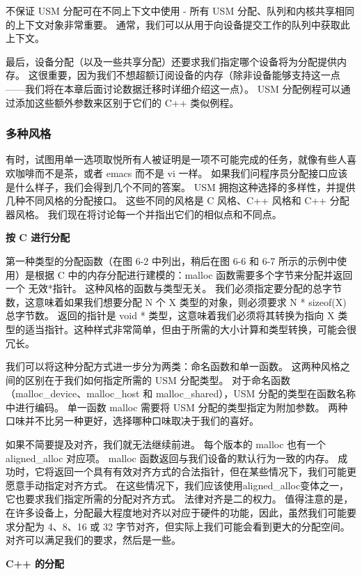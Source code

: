 不保证 USM 分配可在不同上下文中使用 - 所有 USM 分配、队列和内核共享相同的上下文对象非常重要。 通常，我们可以从用于向设备提交工作的队列中获取此上下文。

最后，设备分配（以及一些共享分配）还要求我们指定哪个设备将为分配提供内存。 这很重要，因为我们不想超额订阅设备的内存（除非设备能够支持这一点——我们将在本章后面讨论数据迁移时详细介绍这一点）。 USM 分配例程可以通过添加这些额外参数来区别于它们的 C++ 类似例程。

\subsubsection{多种风格}
有时，试图用单一选项取悦所有人被证明是一项不可能完成的任务，就像有些人喜欢咖啡而不是茶，或者 emacs 而不是 vi 一样。 如果我们问程序员分配接口应该是什么样子，我们会得到几个不同的答案。 USM 拥抱这种选择的多样性，并提供几种不同风格的分配接口。 这些不同的风格是 C 风格、C++ 风格和 C++ 分配器风格。 我们现在将讨论每一个并指出它们的相似点和不同点。

\textbf{按 C 进行分配}

第一种类型的分配函数（在图 6-2 中列出，稍后在图 6-6 和 6-7 所示的示例中使用）是根据 C 中的内存分配进行建模的：malloc 函数需要多个字节来分配并返回一个 无效*指针。 这种风格的函数与类型无关。 我们必须指定要分配的总字节数，这意味着如果我们想要分配 N 个 X 类型的对象，则必须要求 N * sizeof(X) 总字节数。 返回的指针是 void * 类型，这意味着我们必须将其转换为指向 X 类型的适当指针。这种样式非常简单，但由于所需的大小计算和类型转换，可能会很冗长。

我们可以将这种分配方式进一步分为两类：命名函数和单一函数。 这两种风格之间的区别在于我们如何指定所需的 USM 分配类型。 对于命名函数（malloc\_device、malloc\_host 和 malloc\_shared），USM 分配的类型在函数名称中进行编码。 单一函数 malloc 需要将 USM 分配的类型指定为附加参数。 两种口味并不比另一种更好，选择哪种口味取决于我们的喜好。

如果不简要提及对齐，我们就无法继续前进。 每个版本的 malloc 也有一个aligned\_alloc 对应项。 malloc 函数返回与我们设备的默认行为一致的内存。 成功时，它将返回一个具有有效对齐方式的合法指针，但在某些情况下，我们可能更愿意手动指定对齐方式。 在这些情况下，我们应该使用aligned\_alloc变体之一，它也要求我们指定所需的分配对齐方式。 法律对齐是二的权力。 值得注意的是，在许多设备上，分配最大程度地对齐以对应于硬件的功能，因此，虽然我们可能要求分配为 4、8、16 或 32 字节对齐，但实际上我们可能会看到更大的分配空间。 对齐可以满足我们的要求，然后是一些。

\textbf{C++ 的分配}

